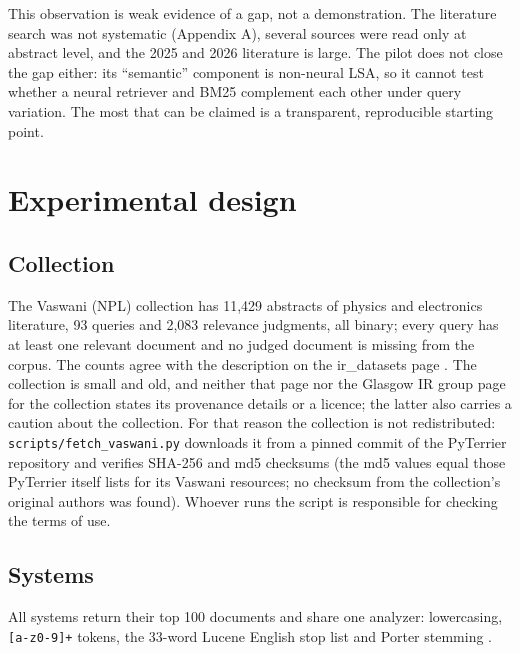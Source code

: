 \documentclass[
  11pt,
]{article}
\begin{document}
This observation is weak evidence of a gap, not a demonstration. The
literature search was not systematic (Appendix A), several sources were
read only at abstract level, and the 2025 and 2026 literature is large.
The pilot does not close the gap either: its ``semantic'' component is
non-neural LSA, so it cannot test whether a neural retriever and BM25
complement each other under query variation. The most that can be
claimed is a transparent, reproducible starting point.

\hypertarget{experimental-design}{%
\section{Experimental design}\label{experimental-design}}

\hypertarget{collection}{%
\subsection{Collection}\label{collection}}

The Vaswani (NPL) collection has 11,429 abstracts of physics and
electronics literature, 93 queries and 2,083 relevance judgments, all
binary; every query has at least one relevant document and no judged
document is missing from the corpus. The counts agree with the
description on the ir\_datasets page \citep{irdatasets_vaswani}. The
collection is small and old, and neither that page nor the Glasgow IR
group page for the collection \citep{glasgow_npl} states its provenance
details or a licence; the latter also carries a caution about the
collection. For that reason the collection is not redistributed:
\texttt{scripts/fetch\_vaswani.py} downloads it from a pinned commit of
the PyTerrier repository and verifies SHA-256 and md5 checksums (the md5
values equal those PyTerrier itself lists for its Vaswani resources; no
checksum from the collection's original authors was found). Whoever runs
the script is responsible for checking the terms of use.

\hypertarget{systems}{%
\subsection{Systems}\label{systems}}

All systems return their top 100 documents and share one analyzer:
lowercasing, \texttt{{[}a-z0-9{]}+} tokens, the 33-word Lucene English
stop list and Porter stemming \citep{porter1980}.
\end{document}
